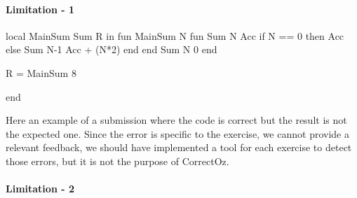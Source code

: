 \documentclass[11pt,a4paper,twoside,openright]{report}
\begin{document}
\paragraph{Limitation - 1}
\begin{OZ}
local MainSum Sum R in
	fun {MainSum N}
		fun {Sum N Acc}
			if N == 0 then Acc
			else {Sum N-1 Acc + (N*2)}
			end	
		end
    {Sum N 0}
	end

	R = {MainSum 8}

end

\end{OZ}

Here an example of a submission where the code is correct but the result is 
not the expected one. Since the error is specific to the exercise, we cannot 
provide a relevant feedback, we should have implemented a tool for each 
exercise to detect those errors, but it is not the purpose of CorrectOz.

%
%
%	
%
%	
%


%
%
%	
%
%	

\paragraph{Limitation - 2}
\end{document}
